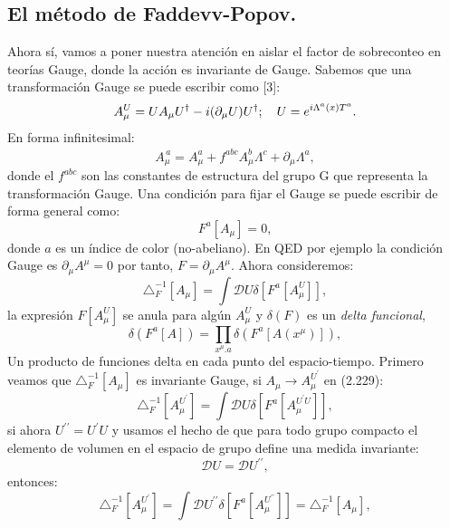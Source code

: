 \subsection{El método de Faddevv-Popov.}
Ahora sí, vamos a poner nuestra atención en aislar el factor de sobreconteo en teorías Gauge, donde la acción es invariante de Gauge. 	Sabemos que una transformación Gauge se puede escribir como [3]:
\begin{equation}
A_{\mu}^{U}=UA_{\mu}U^{\dagger}-i(\partial_{\mu}U)U^{\dagger};\ \ \ U=e^{i\text{\ensuremath{\Lambda}}^{a}(x)T^{a}}.
\end{equation} 
En forma infinitesimal:
\begin{equation}
A_{\mu}^{^{^{^{^{}}}} a}=A_{\mu}^{a}+f^{abc}A_{\mu}^{b}\Lambda^{c}+\partial_{\mu}\Lambda^{a},
\end{equation}
donde el $f^{abc}$ son las constantes de estructura del grupo G que representa la transformación Gauge. Una condición para fijar el Gauge se puede escribir de forma general como:
\begin{equation}
F^a[A_\mu]=0,
\end{equation}
donde $a$ es un índice de color (no-abeliano). En QED por ejemplo la condición Gauge es $\partial_\mu A^\mu=0$ por tanto, $F=\partial_\mu A^\mu$. Ahora consideremos:
\begin{equation}
\triangle_{F}^{-1}[A_{\mu}]=\int\mathcal{D}U\delta[F^{a}[A_{\mu}^{U}]],
\end{equation}
la expresión $F[A_{\mu}^{U}]$ se anula para algún $A_{\mu}^{U}$ y $\delta(F)$ es un 	\textit{delta funcional},
\begin{equation}
\delta(F^{a}[A])=\prod_{x^{\mu}.a}\delta(F^{a}[A(x^{\mu})]),
\end{equation} 
Un producto de funciones delta en cada punto del espacio-tiempo. Primero veamos que $\triangle_{F}^{-1}[A_\mu]$ es invariante Gauge, si $A_\mu \to A_{\mu}^{U^{\prime}}$ en (2.229):
\begin{equation}
\triangle_{F}^{-1}[A_{\mu}^{U^{\prime}}]=\int\mathcal{D}U\delta[F^{a}[A_{\mu}^{U^{\prime}U}]],
\end{equation}
si ahora $U^{\prime \prime}=U^{\prime}U$ y usamos el hecho de que para todo grupo compacto el elemento de volumen en el espacio de grupo define una medida invariante:
\begin{equation}
\mathcal{D}U=\mathcal{D}U^{\prime \prime},
\end{equation}
entonces:
\begin{equation}
\triangle_{F}^{-1}[A_{\mu}^{U^{\prime}}]=\int\mathcal{D}U^{\prime\prime}\delta[F^{a}[A_{\mu}^{U^{\prime\prime}}]]=\triangle_{F}^{-1}[A_{\mu}],
\end{equation}
